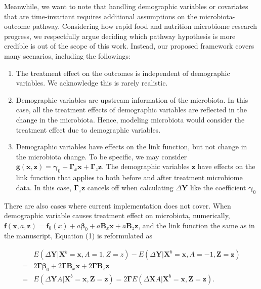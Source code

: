 \documentclass[11pt]{article}
\begin{document}
Meanwhile, we want to note that handling demographic variables or covariates that are time-invariant requires additional assumptions on the microbiota-outcome pathway. Considering how rapid food and nutrition microbiome research progress, we respectfully argue deciding which pathway hypothesis is more credible is out of the scope of this work. Instead, our proposed framework covers many scenarios, including the followings:
\begin{enumerate}
    \item The treatment effect on the outcomes is independent of demographic variables. We acknowledge this is rarely realistic.
    \item Demographic variables are upstream information of the microbiota. In this case, all the treatment effects of demographic variables are reflected in the change in the microbiota. Hence, modeling microbiota would consider the treatment effect due to demographic variables.
    \item Demographic variables have effects on the link function, but not change in the microbiota change. To be specific, we may consider $\bm g(\bm x, \bm z)= \bm \gamma_0 + \bm \Gamma_x \bm x + \bm \Gamma_z \bm z$. The demographic variables $\bm z$ have effects on the link function that applies to both before and after treatment microbiome data. In this case, $\bm \Gamma_z \bm z$ cancels off when calculating $\Delta \bm Y$ like the coefficient $\bm \gamma_0$
\end{enumerate}
There are also cases where current implementation does not cover. When demographic variable causes treatment effect on microbiota, numerically, $\bm f(\bm x,a, \bm z) = \bm f_0(x) + a \boldsymbol \beta_0 + a\bm B_x \bm x + a\bm B_z \bm z$, and the link function the same as in the manuscript, Equation (1) is reformulated as

\begin{align*}
    & E(\Delta \bm{Y}|\bm X^b = \bm x, A = 1, Z= z) - E(\Delta \bm{Y}|\bm X^b = \bm x, A = -1, \bm Z=\bm z)\\
    =& 2 \bm \Gamma \boldsymbol \beta_0 + 2 \bm \Gamma \bm B_x \bm x + 2 \bm \Gamma \bm B_z \bm z \\
    =& E(\Delta \bm Y A | \bm X^b=\bm x, \bm Z =\bm z) = 2\bm\Gamma E(\Delta \bm X A| \bm X^b
    =\bm x, \bm Z =\bm z).
\end{align*}
\end{document}
